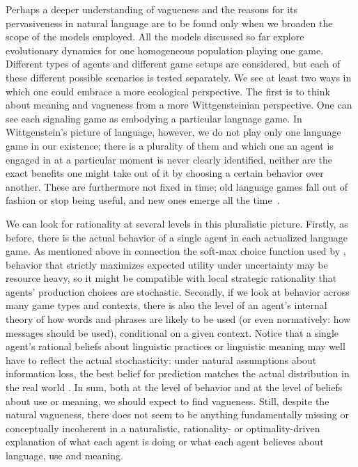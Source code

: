 \documentclass[a4paper]{article}
\newcommand{\mf}[1]{\textcolor{Red}{[mf: #1]}}
\begin{document}
Perhaps a deeper understanding of vagueness and the reasons for its pervasiveness in natural language are to be found only when we broaden the scope of the models employed.
All the models discussed so far explore evolutionary dynamics for one homogeneous population playing one game.
Different types of agents and different game setups are considered, but each of these different possible scenarios is tested separately.
We see at least two ways in which one could embrace a more ecological perspective.
The first is to think about meaning and vagueness from a more Wittgensteinian perspective.
One can see each signaling game as embodying a particular language game.
In Wittgenstein's picture of language, however, we do not play only one language game in our existence; there is a plurality of them and which one an agent is engaged in at a particular moment is never clearly identified, neither are the exact benefits one might take out of it by choosing a certain behavior over another.
These are furthermore not fixed in time; old language games fall out of fashion or stop being useful, and new ones emerge all the time~\parencite[see][and in particular \S 23]{wittgenstein_philosophical_1953}.

We can look for rationality at several levels in this pluralistic picture.
Firstly, as before, there is the actual behavior of a single agent in each actualized language game.
As mentioned above in connection the soft-max choice function used by \textcite{franke_vagueness_2011}, behavior that strictly maximizes expected utility under uncertainty may be resource heavy, so it might be compatible with local strategic rationality that agents' production choices are stochastic.
Secondly, if we look at behavior across many game types and contexts, there is also the level of an agent's internal theory of how words and phrases are likely to be used (or even normatively: how messages should be used), conditional on a given context.
Notice that a single agent's rational beliefs about linguistic practices or linguistic meaning may well have to reflect the actual stochasticity: under natural assumptions about information loss, the best belief for prediction matches the actual distribution in the real world \parencite[\emph{e.g.}][]{VehtariOjanen2012:A-survey-of-Bay}.
In sum, both at the level of behavior and at the level of beliefs about use or meaning, we should expect to find vagueness.
Still, despite the natural vagueness, there does not seem to be anything fundamentally missing or conceptually incoherent in a naturalistic, rationality- or optimality-driven explanation of what each agent is doing or what each agent believes about language, use and meaning.
\end{document}
